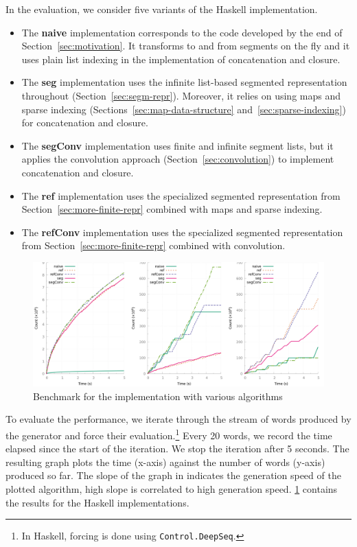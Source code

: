 In the evaluation, we consider five variants of the Haskell implementation.
\begin{itemize}
\item The \textbf{naive} implementation corresponds to the code developed by
  the end of Section~\ref{sec:motivation}. It transforms to and from
  segments on the fly and it uses plain list indexing in the
  implementation of concatenation and closure.
\item The \textbf{seg} implementation uses the infinite list-based segmented
  representation throughout (Section~\ref{sec:segm-repr}). Moreover,
  it relies on using maps and sparse indexing
  (Sections~\ref{sec:map-data-structure} and~\ref{sec:sparse-indexing})
  for concatenation and closure.
\item The \textbf{segConv} implementation uses finite and infinite
  segment lists, but it applies the convolution approach
  (Section~\ref{sec:convolution}) to implement concatenation and
  closure.
\item The \textbf{ref} implementation uses the specialized segmented
  representation from Section~\ref{sec:more-finite-repr} combined with
  maps and sparse indexing.
\item The \textbf{refConv} implementation uses the specialized
  segmented representation from Section~\ref{sec:more-finite-repr}
  combined with convolution.
\end{itemize}

\begin{figure}[tp]
  \centering
  \includegraphics[width=\linewidth]{measure/haskell_all.png}
  \caption{Benchmark for the \haskell implementation with various algorithms}
  \label{bench:haskell:all}
\end{figure}
To evaluate the performance, we iterate through the stream of words
produced by the generator and force their evaluation.\footnote{In
  Haskell, forcing is done using \lstinline{Control.DeepSeq}.} Every
20 words, we record the time elapsed since the start of the iteration. We
stop the iteration after 5 seconds. The resulting graph plots the time (x-axis) against the number of words (y-axis) produced so far. The slope of the graph in indicates the generation speed of the plotted algorithm, high slope is correlated to high generation speed.  \cref{bench:haskell:all} contains the results for the Haskell implementations.

